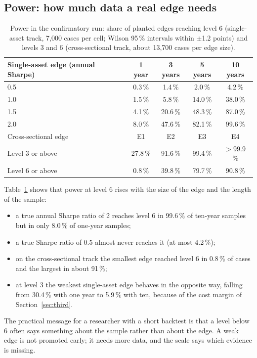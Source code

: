 \documentclass[11pt]{article}
\begin{document}
\subsection{Power: how much data a real edge needs}

\begin{table}[ht]
\centering\small
\begin{tabular}{@{}lcccc@{}}
\toprule
Single-asset edge (annual Sharpe) & 1 year & 3 years & 5 years & 10 years\\
\midrule
0.5 & 0.3\,\% & 1.4\,\% & 2.0\,\% & 4.2\,\% \\
1.0 & 1.5\,\% & 5.8\,\% & 14.0\,\% & 38.0\,\% \\
1.5 & 4.1\,\% & 20.6\,\% & 48.3\,\% & 87.0\,\% \\
2.0 & 8.0\,\% & 47.6\,\% & 82.1\,\% & 99.6\,\% \\
\midrule
Cross-sectional edge & E1 & E2 & E3 & E4 \\
\midrule
Level 3 or above & 27.8\,\% & 91.6\,\% & 99.4\,\% & $>$99.9\,\% \\
Level 6 or above & 0.8\,\% & 39.8\,\% & 79.7\,\% & 90.8\,\% \\
\bottomrule
\end{tabular}
\caption{Power in the confirmatory run: share of planted edges reaching level 6 (single-asset track, 7,000 cases per
cell; Wilson 95\,\% intervals within $\pm$1.2 points) and levels 3 and 6 (cross-sectional track, about 13,700 cases per
edge size).}\label{tab:power}
\end{table}

Table~\ref{tab:power} shows that power at level 6 rises with the size of the edge and the length of the sample:
\begin{itemize}
\item a true annual Sharpe ratio of 2 reaches level 6 in 99.6\,\% of ten-year samples but in only 8.0\,\% of one-year
samples;
\item a true Sharpe ratio of 0.5 almost never reaches it (at most 4.2\,\%);
\item on the cross-sectional track the smallest edge reached level 6 in 0.8\,\% of cases and the largest in about
91\,\%;
\item at level 3 the weakest single-asset edge behaves in the opposite way, falling from 30.4\,\% with one year to
5.9\,\% with ten, because of the cost margin of Section~\ref{sec:third}.
\end{itemize}
The practical message for a researcher with a short backtest is that a level below 6 often says something about the
sample rather than about the edge. A weak edge is not promoted early; it needs more data, and the scale says which
evidence is missing.
\end{document}
